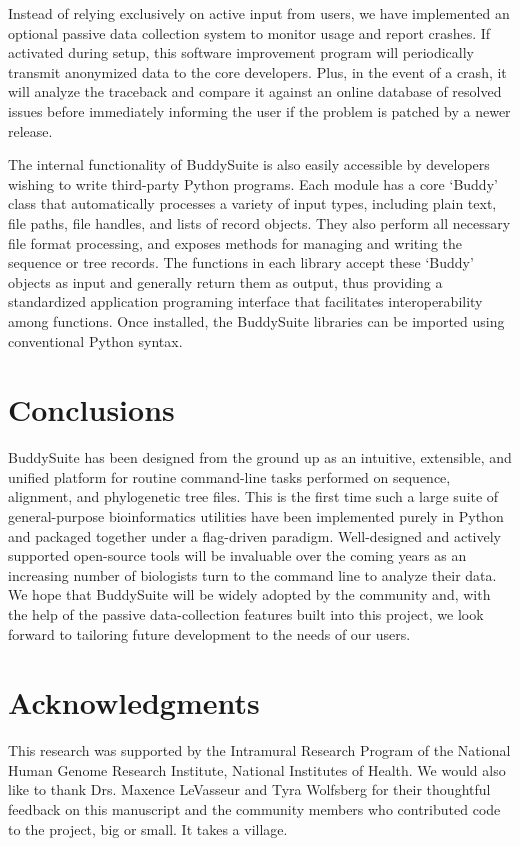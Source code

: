 \documentclass[nogrid]{MBE_article}%
\begin{document}
Instead of relying exclusively on active input from users, we have implemented an optional passive data collection system to monitor usage and report crashes. If activated during setup, this software improvement program will periodically transmit anonymized data to the core developers. Plus, in the event of a crash, it will analyze the traceback and compare it against an online database of resolved issues before immediately informing the user if the problem is patched by a newer release.

The internal functionality of BuddySuite is also easily accessible by developers wishing to write third-party Python programs. Each module has a core `Buddy' class that automatically processes a variety of input types, including plain text, file paths, file handles, and lists of record objects. They also perform all necessary file format processing, and exposes methods for managing and writing the sequence or tree records. The functions in each library accept these `Buddy' objects as input and generally return them as output, thus providing a standardized application programing interface that facilitates interoperability among functions. Once installed, the BuddySuite libraries can be imported using conventional Python syntax.

\section{Conclusions}
BuddySuite has been designed from the ground up as an intuitive, extensible, and unified platform for routine command-line tasks performed on sequence, alignment, and phylogenetic tree files. This is the first time such a large suite of general-purpose bioinformatics utilities have been implemented purely in Python and packaged together under a flag-driven paradigm. Well-designed and actively supported open-source tools will be invaluable over the coming years as an increasing number of biologists turn to the command line to analyze their data. We hope that BuddySuite will be widely adopted by the community and, with the help of the passive data-collection features built into this project, we look forward to tailoring future development to the needs of our users.


\section{Acknowledgments}
This research was supported by the Intramural Research Program of the National Human Genome Research Institute, National Institutes of Health. We would also like to thank Drs. Maxence LeVasseur and Tyra Wolfsberg for their thoughtful feedback on this manuscript and the community members who contributed code to the project, big or small. It takes a village.
\end{document}
